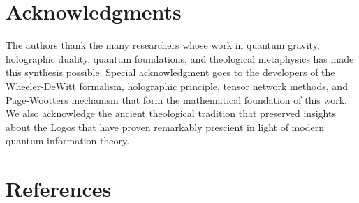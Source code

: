 \documentclass[12pt,a4paper]{article}
\begin{document}
\section*{Acknowledgments}

The authors thank the many researchers whose work in quantum gravity, holographic duality, quantum foundations, and theological metaphysics has made this synthesis possible. Special acknowledgment goes to the developers of the Wheeler-DeWitt formalism, holographic principle, tensor network methods, and Page-Wootters mechanism that form the mathematical foundation of this work. We also acknowledge the ancient theological tradition that preserved insights about the Logos that have proven remarkably prescient in light of modern quantum information theory.

\section*{References}
\end{document}
